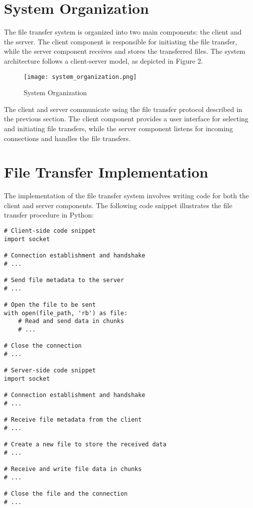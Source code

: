 \documentclass{article}
\begin{document}
\section{System Organization}
The file transfer system is organized into two main components: the client and the server. The client component is responsible for initiating the file transfer, while the server component receives and stores the transferred files. The system architecture follows a client-server model, as depicted in Figure 2.

\begin{figure}[h]
  \centering
  \texttt{[image: system\_organization.png]}
  \caption{System Organization}
  \label{fig:organization}
\end{figure}

The client and server communicate using the file transfer protocol described in the previous section. The client component provides a user interface for selecting and initiating file transfers, while the server component listens for incoming connections and handles the file transfers.

\section{File Transfer Implementation}
The implementation of the file transfer system involves writing code for both the client and server components. The following code snippet illustrates the file transfer procedure in Python:

\begin{verbatim}
# Client-side code snippet
import socket

# Connection establishment and handshake
# ...

# Send file metadata to the server
# ...

# Open the file to be sent
with open(file_path, 'rb') as file:
    # Read and send data in chunks
    # ...

# Close the connection
# ...

# Server-side code snippet
import socket

# Connection establishment and handshake
# ...

# Receive file metadata from the client
# ...

# Create a new file to store the received data
# ...

# Receive and write file data in chunks
# ...

# Close the file and the connection
# ...
\end{verbatim}
\end{document}
